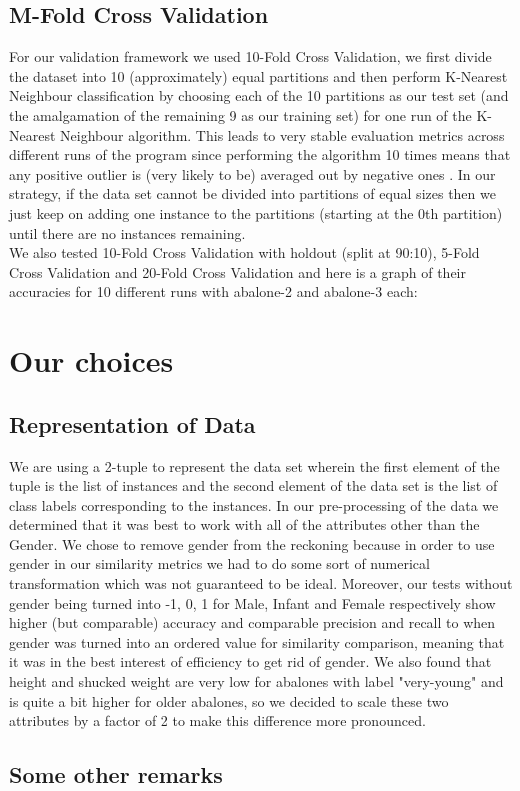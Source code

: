 \subsection{M-Fold Cross Validation}

For our validation framework we used 10-Fold Cross Validation, we first divide the dataset into 10 (approximately) equal partitions and then perform K-Nearest Neighbour classification by choosing each of the 10 partitions as our test set (and the amalgamation of the remaining 9 as our training set) for one run of the K-Nearest Neighbour algorithm. This leads to very stable evaluation metrics across different runs of the program since performing the algorithm 10 times means that any positive outlier is (very likely to be) averaged out by negative ones
. In our strategy, if the data set cannot be divided into partitions of equal sizes then we just keep on adding one instance to the partitions (starting at the 0th partition) until there are no instances remaining.\\

We also tested 10-Fold Cross Validation with holdout (split at 90:10), 5-Fold Cross Validation and 20-Fold Cross Validation and here is a graph of their accuracies for 10 different runs with abalone-2 and abalone-3 each:





\section{Our choices}

\subsection{Representation of Data}

We are using a 2-tuple to represent the data set wherein the first element of the tuple is the list of instances and the second element of the data set is the list of class labels corresponding to the instances. 
In our pre-processing of the data we determined that it was best to work with all of the attributes other than the Gender. We chose to remove gender from the reckoning because in order to use gender in our similarity metrics we had to do some sort of numerical transformation which was not guaranteed to be ideal. Moreover, our tests without gender being turned into -1, 0, 1 for Male, Infant and Female respectively show higher (but comparable) accuracy and comparable precision and recall to when gender was turned into an ordered value for similarity comparison, meaning that it was in the best interest of efficiency to get rid of gender. 
We also found that height and shucked weight are very low for abalones with label "very-young" and is quite a bit higher for older abalones, so we decided to scale these two attributes by a factor of 2 to make this difference more pronounced. 

\subsection{Some other remarks}



